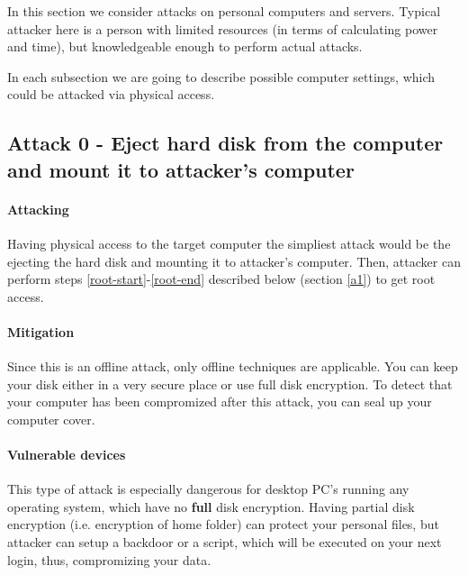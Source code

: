 In this section we consider attacks on personal computers and servers. Typical attacker here is a person with limited resources (in terms of calculating power and time), but knowledgeable enough to perform actual attacks. 

In each subsection we are going to describe possible computer settings, which could be attacked via physical access.

\subsection{Attack 0 - Eject hard disk from the computer and mount it to attacker's computer} \label{a0}

\paragraph*{Attacking}
Having physical access to the target computer the simpliest attack would be the ejecting the hard disk and mounting it to attacker's computer. Then, attacker can perform steps \ref{root-start}-\ref{root-end} described below (section \ref{a1}) to get root access.

\paragraph*{Mitigation}
Since this is an offline attack, only offline techniques are applicable. You can keep your disk either in a very secure place or use full disk encryption. To detect that your computer has been compromized after this attack, you can seal up your computer cover.

\paragraph*{Vulnerable devices}
This type of attack is especially dangerous for desktop PC's running any operating system, which have no \textbf{full} disk encryption. Having partial disk encryption (i.e. encryption of home folder) can protect your personal files, but attacker can setup a backdoor or a script, which will be executed on your next login, thus, compromizing your data.

